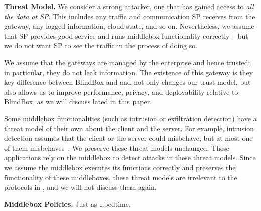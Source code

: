 {\bf Threat Model.}
We consider a strong  attacker, one that has gained access to {\em all the data at SP}.
This includes any traffic and communication SP receives from the 
gateway, any logged information, cloud state, and so on. Nevertheless, we assume that 
SP provides good service and runs middlebox functionality correctly -- but we do not want SP to 
see the traffic in the process of doing so.  

We assume that the gateways are managed by the enterprise and hence trusted; in particular,  they do not leak information.
The existence of this gateway is they key difference between BlindBox and \sys and not only changes our trust model, but also allows us to improve performance, privacy, and deployability relative to BlindBox, as we will discuss lated in this paper.

Some middlebox functionalities (such as intrusion or exfiltration detection) have a threat model
of their own about the client and the server. For example, intrusion detection assumes that 
the client or the server could misbehave, but at most one of them misbehaves~\cite{Bro}.  
We preserve these threat models unchanged. These applications rely
on the middlebox to detect attacks in these threat models. Since we assume the middlebox executes
its functions correctly and \sys preserves the functionality of these middleboxes, 
these threat models are irrelevant to the protocols in \sys, and we will not discuss them again. 

{\bf Middlebox Policies.}
Just as \ldots bedtime.

